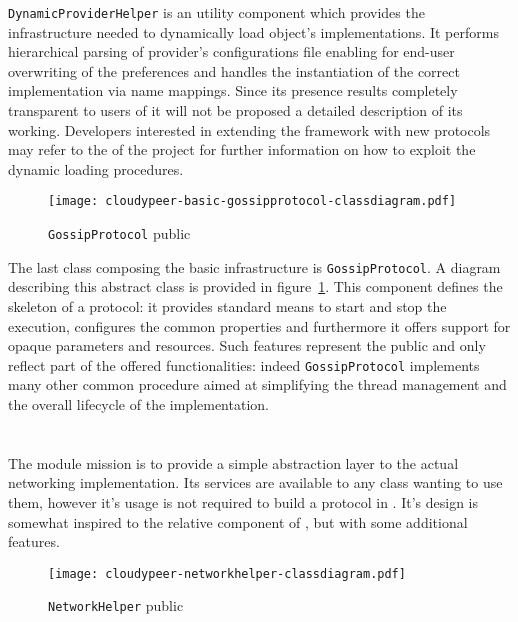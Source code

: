 \noindent\texttt{DynamicProviderHelper} is an utility component which
provides the infrastructure needed to dynamically load object's
implementations. It performs hierarchical parsing of provider's
configurations file enabling for end-user overwriting of the
preferences and handles the instantiation of the correct
implementation via name mappings. Since its presence results completely
transparent to users of \cloudypeer it will not be proposed a detailed
description of its working. Developers interested in extending the
framework with new protocols may refer to the \javadoc of the project
for further information on how to exploit the dynamic loading procedures.

\begin{figure}[h!]
  \centering
  \texttt{[image: cloudypeer-basic-gossipprotocol-classdiagram.pdf]}
  \caption{\texttt{GossipProtocol} public \api}
  \label{fig:cloudypeer-gossipprotocol-class}
\end{figure}

The last class composing the basic infrastructure is
\texttt{GossipProtocol}. A diagram describing this abstract class is
provided in figure~\ref{fig:cloudypeer-gossipprotocol-class}. This
component defines the skeleton of a \gossip protocol: it provides
standard means to start and stop the execution, configures the common
properties and furthermore it offers support for opaque parameters
and resources. Such features represent the public \api and
only reflect part of the offered functionalities: indeed
\texttt{GossipProtocol} implements many other common procedure aimed at
simplifying the thread management and the overall lifecycle of the
implementation.

\section{\networkhelper}
The \networkhelper module mission is to provide a simple abstraction
layer to the actual networking implementation. Its services are
available to any class wanting to use them, however it's usage is not
required to build a protocol in \cloudypeer. It's design is somewhat
inspired to the relative component of \grapes, but with some
additional features.

\begin{figure}[h!]
  \centering
  \texttt{[image: cloudypeer-networkhelper-classdiagram.pdf]}
  \caption{\texttt{NetworkHelper} public \api}
  \label{fig:cloudypeer-nethelper-class}
\end{figure}

